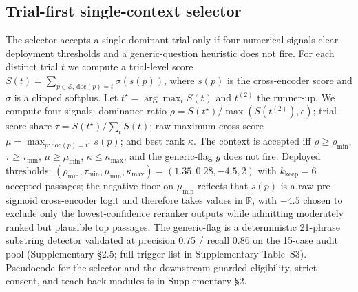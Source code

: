 \documentclass[11pt]{article}
\begin{document}
\subsection{Trial-first single-context selector}
The selector accepts a single dominant trial only if four numerical signals clear deployment thresholds and a generic-question heuristic does not fire. For each distinct trial $t$ we compute a trial-level score $S(t) = \sum_{p \in \mathcal{E},\, \mathrm{doc}(p)=t} \sigma(s(p))$, where $s(p)$ is the cross-encoder score and $\sigma$ is a clipped softplus. Let $t^\star = \arg\max_t S(t)$ and $t^{(2)}$ the runner-up. We compute four signals: dominance ratio $\rho = S(t^\star)/\max(S(t^{(2)}), \epsilon)$; trial-score share $\tau = S(t^\star)/\sum_t S(t)$; raw maximum cross score $\mu = \max_{p:\mathrm{doc}(p)=t^\star} s(p)$; and best rank $\kappa$. The context is accepted iff $\rho \ge \rho_{\min}$, $\tau \ge \tau_{\min}$, $\mu \ge \mu_{\min}$, $\kappa \le \kappa_{\max}$, and the generic-flag $g$ does not fire. Deployed thresholds: $(\rho_{\min}, \tau_{\min}, \mu_{\min}, \kappa_{\max}) = (1.35, 0.28, -4.5, 2)$ with $k_{\text{keep}}=6$ accepted passages; the negative floor on $\mu_{\min}$ reflects that $s(p)$ is a raw pre-sigmoid cross-encoder logit and therefore takes values in $\mathbb{R}$, with $-4.5$ chosen to exclude only the lowest-confidence reranker outputs while admitting moderately ranked but plausible top passages. The generic-flag is a deterministic 21-phrase substring detector validated at precision 0.75 / recall 0.86 on the 15-case audit pool (Supplementary \S2.5; full trigger list in Supplementary Table~S3). Pseudocode for the selector and the downstream guarded eligibility, strict consent, and teach-back modules is in Supplementary \S2.
\end{document}
